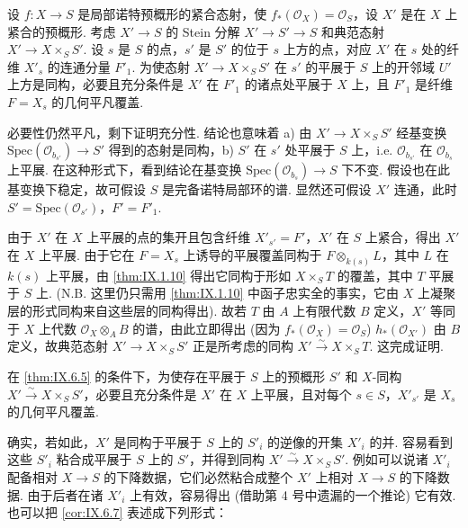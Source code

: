 \begin{corollary}\label{cor:IX.6.6}
设 $f \colon X \to S$ 是局部诺特预概形的紧合态射，使 $f_*(\mathcal{O}_X) = \mathcal{O}_S$，设 $X'$ 是在 $X$ 上紧合的预概形. 考虑 $X' \to S$ 的 Stein 分解 $X' \to S' \to S$ 和典范态射 $X' \to X \times_S S'$. 设 $s$ 是 $S$ 的点，$s'$ 是 $S'$ 的位于 $s$ 上方的点，对应 $X'$ 在 $s$ 处的纤维 $X'_s$ 的连通分量 $F'_1$. 为使态射 $X' \to X \times_S S'$ 在 $s'$ 的平展于 $S$ 上的开邻域 $U'$ 上方是同构，必要且充分条件是 $X'$ 在 $F'_1$ 的诸点处平展于 $X$ 上，且 $F'_1$ 是纤维 $F = X_s$ 的几何平凡覆盖.
\end{corollary}

必要性仍然平凡，剩下证明充分性. 结论也意味着 a) 由 $X' \to X \times_S S'$ 经基变换 $\mathrm{Spec}(\mathcal{O}_{b_{s'}}) \to S'$ 得到的态射是同构，b) $S'$ 在 $s'$ 处平展于 $S$ 上，i.e. $\mathcal{O}_{b_{s'}}$ 在 $\mathcal{O}_{b_s}$ 上平展. 在这种形式下，看到结论在基变换 $\mathrm{Spec}(\mathcal{O}_{b_s}) \to S$ 下不变. 假设也在此基变换下稳定，故可假设 $S$ 是完备诺特局部环的谱. 显然还可假设 $X'$ 连通，此时 $S' = \mathrm{Spec}(\mathcal{O}_{s'})$，$F' = F'_1$.

由于 $X'$ 在 $X$ 上平展的点的集开且包含纤维 $X'_{s'} = F'$，$X'$ 在 $S$ 上紧合，得出 $X'$ 在 $X$ 上平展. 由于它在 $F = X_s$ 上诱导的平展覆盖同构于 $F \otimes_{k(s)} L$，其中 $L$ 在 $k(s)$ 上平展，由 \ref{thm:IX.1.10} 得出它同构于形如 $X \times_S T$ 的覆盖，其中 $T$ 平展于 $S$ 上. (N.B. 这里仍只需用 \ref{thm:IX.1.10} 中函子忠实全的事实，它由 $X$ 上凝聚层的形式同构来自这些层的同构得出). 故若 $T$ 由 $A$ 上有限代数 $B$ 定义，$X'$ 等同于 $X$ 上代数 $\mathcal{O}_X \otimes_A B$ 的谱，由此立即得出 (因为 $f_*(\mathcal{O}_X) = \mathcal{O}_S$) $h_*(\mathcal{O}_{X'})$ 由 $B$ 定义，故典范态射 $X' \to X \times_S S'$ 正是所考虑的同构 $X' \xrightarrow{\sim} X \times_S T$. 这完成证明.

\begin{corollary}\label{cor:IX.6.7}
在 \ref{thm:IX.6.5} 的条件下，为使存在平展于 $S$ 上的预概形 $S'$ 和 $X$-同构 $X' \xrightarrow{\sim} X \times_S S'$，必要且充分条件是 $X'$ 在 $X$ 上平展，且对每个 $s \in S$，$X'_{s'}$ 是 $X_s$ 的几何平凡覆盖.
\end{corollary}

确实，若如此，$X'$ 是同构于平展于 $S$ 上的 $S'_i$ 的逆像的开集 $X'_i$ 的并. 容易看到这些 $S'_i$ 粘合成平展于 $S$ 上的 $S'$，并得到同构 $X' \xrightarrow{\sim} X \times_S S'$. 例如可以说诸 $X'_i$ 配备相对 $X \to S$ 的下降数据，它们必然粘合成整个 $X'$ 上相对 $X \to S$ 的下降数据. 由于后者在诸 $X'_i$ 上有效，容易得出 (借助第 4 号中遗漏的一个推论) 它有效. 也可以把 \ref{cor:IX.6.7} 表述成下列形式：

